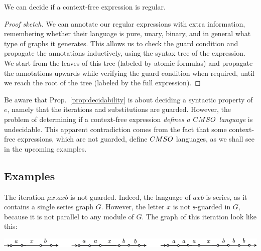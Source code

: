 \begin{proposition}\label{prop:decidability}
We can decide if a  context-free expression is regular.
\end{proposition}
\begin{proof}[Proof sketch]We can annotate our regular expressions with extra information, remembering whether their language is pure, unary, binary, and in
general what type of graphs it generates. This allows us to check the
guard condition and propagate the annotations inductively, using the
syntax tree of the expression.  We start from the leaves of this tree
(labeled by atomic formulas) and propagate the annotations upwards while
verifying the guard condition when required, until we reach the root of
the tree (labeled by the full expression).
\end{proof}
\begin{remark}
Be aware that Prop.~\ref{prop:decidability} is about deciding a syntactic property of $e$, namely that the iterations and substitutions are guarded. However, the problem of determining if a context-free expression \emph{defines a $\CMSO$ language} is undecidable. This apparent contradiction comes from the fact that  some context-free expressions, which are not guarded, define $\CMSO$ languages, as we shall see in the upcoming examples.
\end{remark}



\subsection{Examples}



 


\begin{example} The iteration $\mu x. axb$ is not guarded. Indeed, the language of $axb$ is series, as it contains a single series graph $G$. However, the letter $x$ is not $\mathsf{s}$-guarded in $G$, because it is not parallel to any module of $G$. The graph of this iteration look like this:
\begin{center}
\includegraphics[scale=1]{Pictures/expl0.pdf}
\end{center}
\end{example}
 
